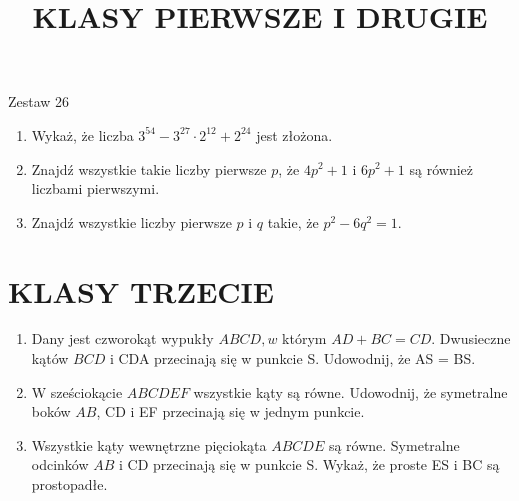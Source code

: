 \documentclass[10pt]{article}
\title{KLASY PIERWSZE I DRUGIE }
\author{}
\date{}
\begin{document}
\maketitle
Zestaw 26

\begin{enumerate}
  \item Wykaż, że liczba \(3^{54}-3^{27} \cdot 2^{12}+2^{24}\) jest złożona.
  \item Znajdź wszystkie takie liczby pierwsze \(p\), że \(4 p^{2}+1\) i \(6 p^{2}+1\) są również liczbami pierwszymi.
  \item Znajdź wszystkie liczby pierwsze \(p\) i \(q\) takie, że \(p^{2}-6 q^{2}=1\).
\end{enumerate}

\section*{KLASY TRZECIE}
\begin{enumerate}
  \item Dany jest czworokąt wypukły \(A B C D, w\) którym \(A D+B C=C D\). Dwusieczne kątów \(B C D\) i CDA przecinają się w punkcie S. Udowodnij, że AS = BS.
  \item W sześciokącie \(A B C D E F\) wszystkie kąty są równe. Udowodnij, że symetralne boków \(A B\), CD i EF przecinają się w jednym punkcie.
  \item Wszystkie kąty wewnętrzne pięciokąta \(A B C D E\) są równe. Symetralne odcinków \(A B\) i CD przecinają się w punkcie S. Wykaż, że proste ES i BC są prostopadłe.
\end{enumerate}
\end{document}
